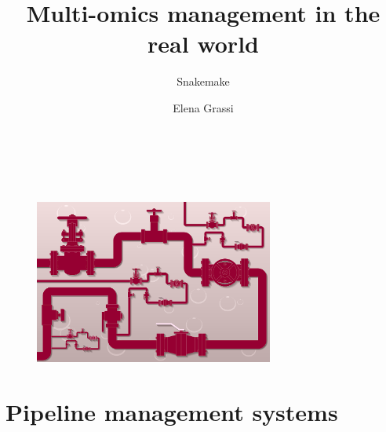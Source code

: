 \documentclass[xcolor=table]{beamer}
\title{\textbf{Multi-omics management in the real world}}
\subtitle{Snakemake}
\author{Elena Grassi}
\begin{document}
\begin{frame}
	\begin{center} \inserttitle

	\vspace{1.5cm}
	\insertauthor  \\
    \small{\textit{\insertsubtitle \\}}
	 \vspace{1.5cm}
	\begin{figure}\includegraphics[width=0.7\textwidth]{./img/pipe.png}\end{figure}
	\end{center}
\end{frame}


\section{Pipeline management systems}
\end{document}
